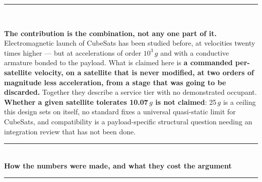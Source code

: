 \documentclass[10pt,a4paper]{article}
\newcommand{\hrulethin}{\textcolor{rule}{\rule{\linewidth}{0.4pt}}}
\newcommand{\hrulefat}{\textcolor{ox}{\rule{\linewidth}{1.6pt}}}
\begin{document}
\vspace{1.8mm}
\hrulefat\\[1.2mm]
{\footnotesize\textbf{The contribution is the combination, not any one part of it.} Electromagnetic
launch of CubeSats has been studied before, at velocities twenty times higher --- but at
accelerations of order $10^3\,g$ and with a conductive armature bonded to the payload. What is
claimed here is \textbf{a commanded per-satellite velocity, on a satellite that is never modified, at
two orders of magnitude less acceleration, from a stage that was going to be discarded.} Together
they describe a service tier with no demonstrated occupant. \textbf{Whether a given satellite
tolerates 10.07\,$g$ is not claimed}: 25\,$g$ is a ceiling this design sets on itself, no standard
fixes a universal quasi-static limit for CubeSats, and compatibility is a payload-specific
structural question needing an integration review that has not been done.\par}

\newpage
\hrulefat\\[2.0mm]
{\large\bfseries How the numbers were made, and what they cost the argument}\\[1.0mm]
\hrulethin\\[2.0mm]
\end{document}
